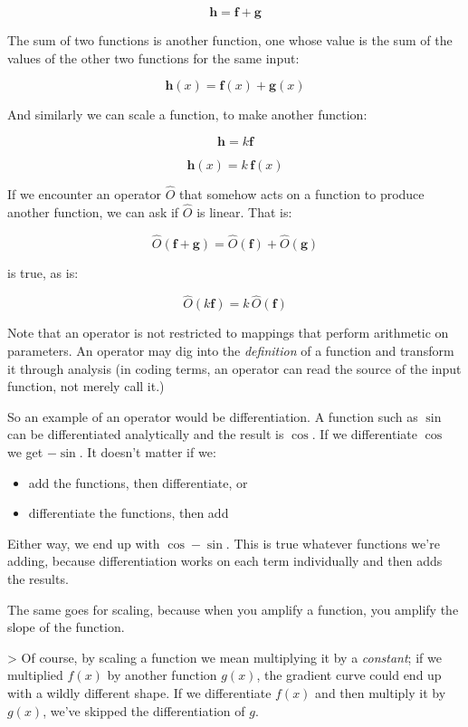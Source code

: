 $$\mathbf{h} = \mathbf{f} + \mathbf{g}$$

The sum of two functions is another function, one whose value is the sum of the values of the other two functions for the same input:

$$\mathbf{h}(x) = \mathbf{f}(x) + \mathbf{g}(x)$$

And similarly we can scale a function, to make another function:

$$\mathbf{h} = k \mathbf{f}$$

$$\mathbf{h}(x) = k \,\mathbf{f}(x)$$

If we encounter an operator $\hat{O}$ that somehow acts on a function to produce another function, we can ask if $\hat{O}$ is linear. That is:

$$\hat{O}(\mathbf{f} + \mathbf{g}) = \hat{O}(\mathbf{f}) + \hat{O}(\mathbf{g})$$

is true, as is:

$$\hat{O}(k\mathbf{f}) = k\,\hat{O}(\mathbf{f})$$

Note that an operator is not restricted to mappings that perform arithmetic on parameters. An operator may dig into the \textit{definition} of a function and transform it through analysis (in coding terms, an operator can read the source of the input function, not merely call it.)

So an example of an operator would be differentiation. A function such as $\sin$ can be differentiated analytically and the result is $\cos$. If we differentiate $\cos$ we get $-\sin$. It doesn't matter if we:

\begin{itemize}    
    \item add the functions, then differentiate, or
    \item differentiate the functions, then add
\end{itemize}

Either way, we end up with $\cos - \sin$. This is true whatever functions we're adding, because differentiation works on each term individually and then adds the results.

The same goes for scaling, because when you amplify a function, you amplify the slope of the function.

> Of course, by scaling a function we mean multiplying it by a \textit{constant}; if we multiplied $f(x)$ by another function $g(x)$, the gradient curve could end up with a wildly different shape. If we differentiate $f(x)$ and then multiply it by $g(x)$, we've skipped the differentiation of $g$.

